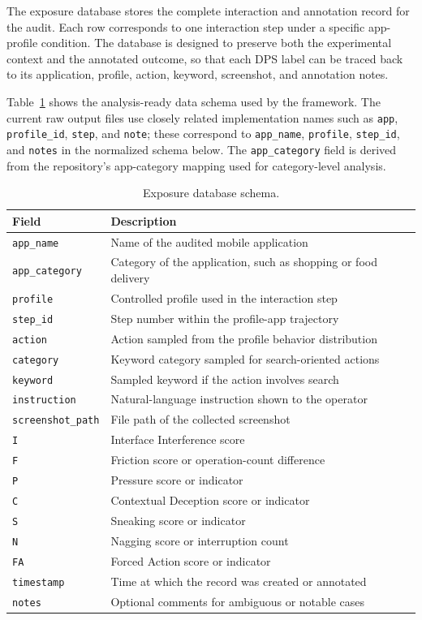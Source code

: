 The exposure database stores the complete interaction and annotation record for the audit. Each row corresponds to one interaction step under a specific app-profile condition. The database is designed to preserve both the experimental context and the annotated outcome, so that each DPS label can be traced back to its application, profile, action, keyword, screenshot, and annotation notes.

Table~\ref{tab:exposure_database_schema} shows the analysis-ready data schema used by the framework. The current raw output files use closely related implementation names such as \texttt{app}, \texttt{profile\_id}, \texttt{step}, and \texttt{note}; these correspond to \texttt{app\_name}, \texttt{profile}, \texttt{step\_id}, and \texttt{notes} in the normalized schema below. The \texttt{app\_category} field is derived from the repository's app-category mapping used for category-level analysis.

	\begin{table}[htbp]
	\centering
	\caption{Exposure database schema.}
	\label{tab:exposure_database_schema}
	\begin{tabular}{ll}
	\hline
	\textbf{Field} & \textbf{Description} \\
	\hline
	\texttt{app\_name} & Name of the audited mobile application \\
	\texttt{app\_category} & Category of the application, such as shopping or food delivery \\
	\texttt{profile} & Controlled profile used in the interaction step \\
	\texttt{step\_id} & Step number within the profile-app trajectory \\
	\texttt{action} & Action sampled from the profile behavior distribution \\
	\texttt{category} & Keyword category sampled for search-oriented actions \\
	\texttt{keyword} & Sampled keyword if the action involves search \\
	\texttt{instruction} & Natural-language instruction shown to the operator \\
	\texttt{screenshot\_path} & File path of the collected screenshot \\
	\texttt{I} & Interface Interference score \\
	\texttt{F} & Friction score or operation-count difference \\
	\texttt{P} & Pressure score or indicator \\
	\texttt{C} & Contextual Deception score or indicator \\
	\texttt{S} & Sneaking score or indicator \\
	\texttt{N} & Nagging score or interruption count \\
	\texttt{FA} & Forced Action score or indicator \\
	\texttt{timestamp} & Time at which the record was created or annotated \\
	\texttt{notes} & Optional comments for ambiguous or notable cases \\
	\hline
	\end{tabular}
	\end{table}

